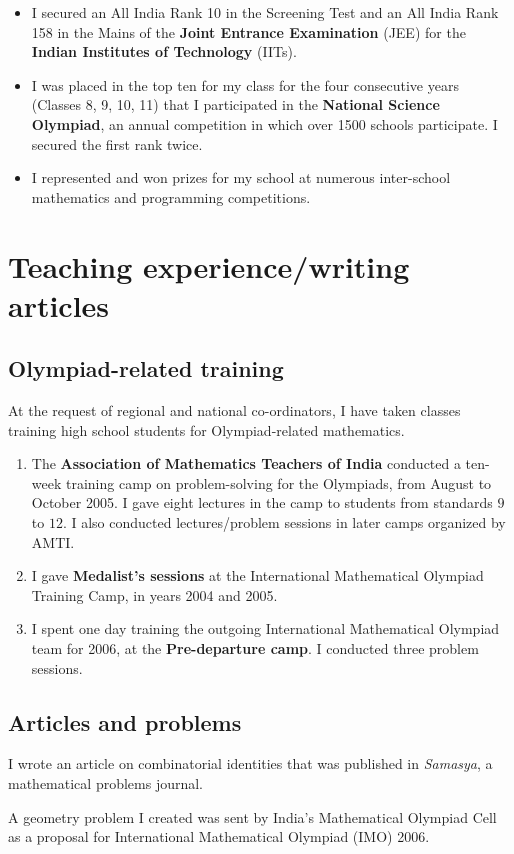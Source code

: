 \documentclass[12pt,a4paper,oneside]{amsart}
\begin{document}
\begin{itemize}

\item I secured an All India Rank 10 in the Screening Test and 
  an All India Rank 158 in the Mains of the {\bf Joint Entrance
  Examination} (JEE) for the {\bf Indian Institutes of Technology} (IITs).

\item I was placed in the top ten for my class for the four
  consecutive years (Classes 8, 9, 10, 11) that I participated in the
  {\bf National Science Olympiad}, an annual competition in which over
  1500 schools participate. I secured the first rank twice.

\item I represented and won prizes for my school at numerous
  inter-school mathematics and programming competitions.

\end{itemize}

\section{Teaching experience/writing articles}

\subsection{Olympiad-related training}

At the request of regional and national co-ordinators, I have taken classes
training high school students for Olympiad-related mathematics.

\begin{enumerate}

\item The {\bf Association of Mathematics Teachers of India} conducted
  a ten-week training camp on problem-solving for the Olympiads, from
  August to October 2005.  I gave eight lectures in the camp to
  students from standards $9$ to $12$. I also conducted lectures/problem
  sessions in later camps organized by AMTI.

\item I gave {\bf Medalist's sessions} at the International Mathematical
  Olympiad Training Camp, in years 2004 and 2005.

\item I spent one day training the outgoing International Mathematical
  Olympiad team for 2006, at the {\bf Pre-departure camp}. I conducted
  three problem sessions.

\end{enumerate}

\subsection{Articles and problems}

I wrote an article on combinatorial identities that was published in 
{\em Samasya}, a mathematical problems journal.

A geometry problem I created was sent by India's Mathematical Olympiad
Cell as a proposal for International Mathematical Olympiad (IMO) 2006.
\end{document}
